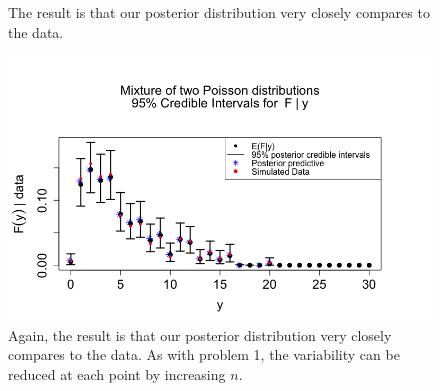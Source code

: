\documentclass[a4paper, 10pt]{article}
\begin{document}
\begin{enumerate}
\begin{figure}[h!]
        \caption{The result is that our posterior distribution very closely compares to the data.}
        \label{2a_post}
    \end{figure}
    \begin{figure}[h!]
        \centering
        \includegraphics[scale = 0.4]{2b_Posterior.png}
        \caption{Again, the result is that our posterior distribution very closely compares to the data. As with problem 1, the variability can be reduced at each point by increasing $n$.}
        \label{2b_post}
    \end{figure}
    
    

\end{enumerate}
\end{document}
